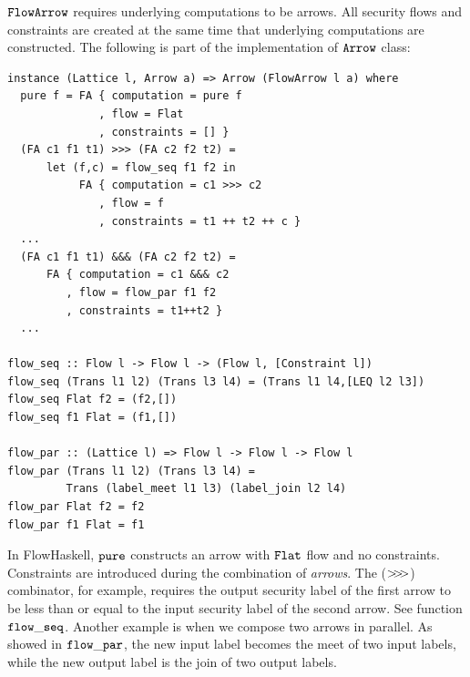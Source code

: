 \documentclass{report}
\newcommand{\arrowop}[1]{$#1\negthickspace #1\negthickspace #1$}
\newcommand{\co}[1]{$\cod{#1}$}
\begin{document}
\co{FlowArrow} requires underlying computations to be arrows. All security flows and
constraints are created at the same time that underlying computations are constructed.
The following is part of the implementation of \co{Arrow} class:
\begin{Verbatim}[fontsize=\small]
instance (Lattice l, Arrow a) => Arrow (FlowArrow l a) where
  pure f = FA { computation = pure f
              , flow = Flat
              , constraints = [] }
  (FA c1 f1 t1) >>> (FA c2 f2 t2) =
      let (f,c) = flow_seq f1 f2 in
           FA { computation = c1 >>> c2
              , flow = f
              , constraints = t1 ++ t2 ++ c }
  ...
  (FA c1 f1 t1) &&& (FA c2 f2 t2) = 
      FA { computation = c1 &&& c2
         , flow = flow_par f1 f2
         , constraints = t1++t2 }
  ...

flow_seq :: Flow l -> Flow l -> (Flow l, [Constraint l])
flow_seq (Trans l1 l2) (Trans l3 l4) = (Trans l1 l4,[LEQ l2 l3])
flow_seq Flat f2 = (f2,[])
flow_seq f1 Flat = (f1,[])

flow_par :: (Lattice l) => Flow l -> Flow l -> Flow l
flow_par (Trans l1 l2) (Trans l3 l4) = 
         Trans (label_meet l1 l3) (label_join l2 l4)
flow_par Flat f2 = f2
flow_par f1 Flat = f1
\end{Verbatim}
In FlowHaskell, \co{pure} constructs an arrow with \co{Flat} flow and no constraints.
Constraints are introduced during the combination of {\em arrows}. The (\arrowop{>}) combinator,
for example, requires the output security label of the first arrow to be less than or equal to
the input security label of the second arrow. See function \co{flow\_seq}.
Another example is when we compose two arrows in parallel. As showed in
\co{flow\_par}, the new input label becomes the meet of two input labels, while the new output label is
the join of two output labels.
\end{document}
